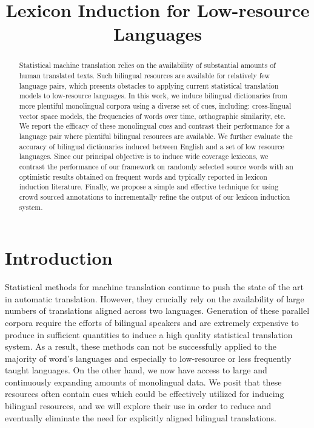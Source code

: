 \documentclass{article}
\title{Lexicon Induction for Low-resource Languages}
\newcommand{\mnote}[1]{\marginpar{%
  \vskip-\baselineskip
  \raggedright\footnotesize
  \itshape\hrule\smallskip\tiny{#1}\par\smallskip\hrule}}
\newcommand{\mtodo}[1]{\mnote{\textcolor{red}{#1}}}
\begin{document}
\maketitle

\begin{abstract}

Statistical machine translation relies on the availability of substantial amounts of human translated texts. Such bilingual resources are available for relatively few language pairs, which presents obstacles to applying current statistical translation models to low-resource languages. In this work, we induce bilingual dictionaries from more plentiful monolingual corpora using a diverse set of cues, including: cross-lingual vector space models, the frequencies of words over time, orthographic similarity, etc.  We report the efficacy of these monolingual cues and contrast their performance for a language pair where plentiful bilingual resources are available.  We further evaluate the accuracy of bilingual dictionaries induced between English and a set of low resource languages.  Since our principal objective is to induce wide coverage lexicons, we contrast the performance of our framework on randomly selected source words with an optimistic results obtained on frequent words and typically reported in lexicon induction literature.  Finally, we propose a simple and effective technique for using crowd sourced annotations to incrementally refine the output of our lexicon induction system.\mtodo{Last sentence doesn't fit too well.}
\end{abstract}

\section{Introduction}

Statistical methods for machine translation continue to push the state of the art in automatic translation. However, they crucially rely on the availability of large numbers of translations aligned across two languages. Generation of these parallel corpora require the efforts of bilingual speakers and are extremely expensive to produce in sufficient quantities to induce a high quality statistical translation system. As a result, these methods can not be successfully applied to the majority of word's languages and especially to low-resource or less frequently taught languages.  On the other hand, we now have access to large and continuously expanding amounts of monolingual data.  We posit that these resources often contain cues which could be effectively utilized for inducing bilingual resources, and we will explore their use in order to reduce and eventually eliminate the need for explicitly aligned bilingual translations.\mtodo{Wordy and vague.}\\
\end{document}
